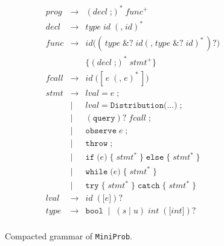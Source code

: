 \begin{figure}
  \centering
  \[
    \begin{array}{rcl}
      prog
       & \to  & (decl\;\texttt{;})^* \;func^+                                                     \\[6pt]

      decl
       & \to  & type\;\mathit{id}\;(\texttt{,}\;\mathit{id})^*                                    \\[6pt]

      func
       & \to  & \mathit{id} \texttt{(}
      (\,type\;\texttt{\&}?\;\mathit{id}
      (\texttt{,}\;type\;\texttt{\&}?\;\mathit{id})^*\,)?
      \texttt{)}                                                                                  \\[-2pt]
       &      & \texttt{\{}(decl\;\texttt{;})^*\;stmt^+\texttt{\}}                                \\[6pt]

      fcall
       & \to  & \mathit{id}\;\texttt{(}
      [\,e\;(\texttt{,}\;e)^*\,]
      \texttt{)}                                                                                  \\[6pt]

      stmt
       & \to  & lval\;\texttt{=}\;e\;\texttt{;}                                                   \\[-2pt]
       & \mid & lval\;\texttt{=}\;\texttt{Distribution(...)}\;\texttt{;}                          \\[-2pt]
       & \mid & (\texttt{query})?\;fcall\;\texttt{;}                                              \\[-2pt]
       & \mid & \texttt{observe}\;e\;\texttt{;}                                                   \\[-2pt]
       & \mid & \texttt{throw}\;\texttt{;}                                                        \\[-2pt]
       & \mid & \texttt{if}\;\texttt{(}e\texttt{)}\;\{\;stmt^*\;\}\;\texttt{else}\;\{\;stmt^*\;\} \\[-2pt]
       & \mid & \texttt{while}\;\texttt{(}e\texttt{)}\;\{\;stmt^*\;\}                             \\[-2pt]
       & \mid & \texttt{try}\;\{\;stmt^*\;\}\;\texttt{catch}\;\{\;stmt^*\;\}                      \\[6pt]

      lval
       & \to  & \mathit{id}\;(\texttt{[}e\texttt{]})?                                             \\[6pt]

      type
       & \to  & \texttt{bool}
      \;\mid\;(s\mid u)\;int\;(\texttt{[}int\texttt{]})?                                          \\[6pt]
    \end{array}
  \]
  \caption{Compacted grammar of \texttt{MiniProb}.}
  \label{fig:ebnf_grammar}
\end{figure}

